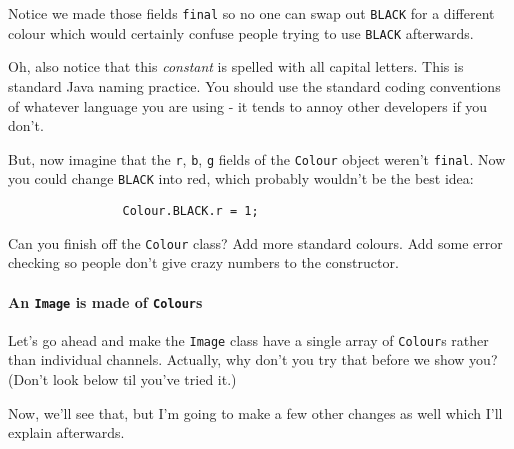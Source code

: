 \documentclass{article}
\begin{document}
            Notice we made those fields \texttt{final} so no one can swap out \texttt{BLACK} for a different colour which would certainly
            confuse people trying to use \texttt{BLACK} afterwards.
        
            Oh, also notice that this \emph{constant} is spelled with all capital letters. This is standard Java naming practice. You
            should use the standard coding conventions of whatever language you are using - it tends to annoy other developers if you don't.
        
            But, now imagine that the \texttt{r}, \texttt{b}, \texttt{g} fields of the \texttt{Colour} object weren't \texttt{final}. Now
            you could change \texttt{BLACK} into red, which probably wouldn't be the best idea:
        
            \begin{verbatim}
                Colour.BLACK.r = 1;
            \end{verbatim}
        
            Can you finish off the \texttt{Colour} class? Add more standard colours. Add some error checking so people don't give crazy
            numbers to the constructor.
        
        \newpage
        \paragraph{An \texttt{Image} is made of \texttt{Colour}s}
            Let's go ahead and make the \texttt{Image} class have a single array of \texttt{Colour}s rather than individual channels.
            Actually, why don't you try that before we show you? (Don't look below til you've tried it.)
            
            Now, we'll see that, but I'm going to make a few other changes as well which I'll explain afterwards.
            
\end{document}

